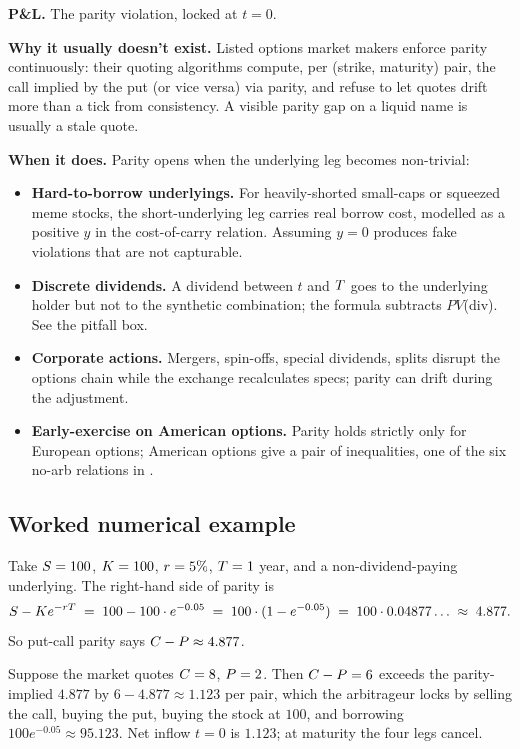 \textbf{P\&L.} The parity violation, locked at $t=0$.

\textbf{Why it usually doesn't exist.} Listed options market
makers enforce parity continuously: their quoting algorithms
compute, per (strike, maturity) pair, the call implied by the
put (or vice versa) via parity, and refuse to let quotes drift
more than a tick from consistency. A visible parity gap on a
liquid name is usually a stale quote.

\textbf{When it does.} Parity opens when the underlying leg
becomes non-trivial:
\begin{itemize}
  \item \textbf{Hard-to-borrow underlyings.} For heavily-shorted
  small-caps or squeezed meme stocks, the short-underlying leg
  carries real borrow cost, modelled as a positive $y$ in the
  cost-of-carry relation. Assuming $y=0$ produces fake
  violations that are not capturable.
  \item \textbf{Discrete dividends.} A dividend between $t$ and
  $T$ goes to the underlying holder but not to the synthetic
  combination; the formula subtracts $PV$(div). See the pitfall
  box.
  \item \textbf{Corporate actions.} Mergers, spin-offs, special
  dividends, splits disrupt the options chain while the exchange
  recalculates specs; parity can drift during the adjustment.
  \item \textbf{Early-exercise on American options.} Parity
  holds strictly only for European options; American options
  give a pair of inequalities, one of the six no-arb relations
  in \citep{damodaranOptionsArbitrage}.
\end{itemize}

\subsection{Worked numerical example}
\label{sec:ch13_parity_example}

Take $S = 100$, $K = 100$, $r = 5\%$, $T = 1$
year, and a non-dividend-paying underlying. The right-hand side
of parity is
\begin{equation*}
  S - K e^{-r T}
  \;=\; 100 - 100 \cdot e^{-0.05}
  \;=\; 100 \cdot (1 - e^{-0.05})
  \;=\; 100 \cdot 0.04877\ldots
  \;\approx\; 4.877.
\end{equation*}
So put-call parity says $C - P \approx 4.877$.

Suppose the market quotes $C = 8$, $P = 2$. Then $C -
P = 6$ exceeds the parity-implied $4.877$ by $6 - 4.877
\approx 1.123$ per pair, which the arbitrageur locks by selling
the call, buying the put, buying the stock at $100$, and
borrowing $100 e^{-0.05} \approx 95.123$. Net inflow $t=0$ is
$1.123$; at maturity the four legs cancel.

